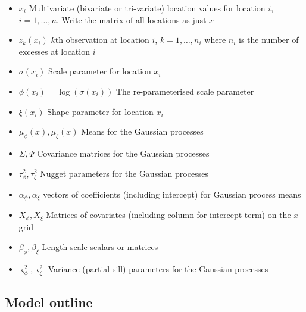 \documentclass{article}
\begin{document}
\begin{itemize}
\item $x_i$ Multivariate (bivariate or tri-variate) location values for location $i$, $i = 1,\ldots, n$. Write the matrix of all locations as just $x$
\item $z_k(x_i)$ $k$th observation at location $i$, $k = 1,\ldots,n_i$ where $n_i$ is the number of excesses at location $i$
\item $\sigma(x_i)$ Scale parameter for location $x_i$
\item $\phi(x_i) = \log(\sigma(x_i))$ The re-parameterised scale parameter
\item $\xi(x_i)$ Shape parameter for location $x_i$
\item $\mu_\phi(x), \mu_\xi(x)$ Means for the Gaussian processes
\item $\Sigma, \Psi$ Covariance matrices for the Gaussian processes
\item $\tau^2_\phi, \tau^2_\xi$ Nugget parameters for the Gaussian processes
\item $\alpha_\phi, \alpha_\xi$ vectors of coefficients (including intercept) for Gaussian process means
\item $X_\phi, X_\xi$ Matrices of covariates (including column for intercept term) on the $x$ grid
\item $\beta_\phi, \beta_\xi$ Length scale scalars or matrices
\item $\varsigma^2_\phi, \varsigma^2_\xi$ Variance (partial sill) parameters for the Gaussian processes
\end{itemize}

\subsection*{Model outline} \label{3outline}
\end{document}
